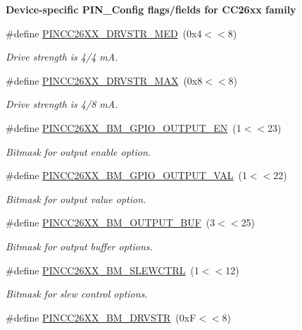 \begin{Indent}{\bf Device-\/specific P\-I\-N\-\_\-\-Config flags/fields for C\-C26xx family}
\begin{DoxyCompactItemize}
\#define \hyperlink{_p_i_n_c_c26_x_x_8h_a2ea27041c2de39b7d28b4a495dd420c3}{P\-I\-N\-C\-C26\-X\-X\-\_\-\-D\-R\-V\-S\-T\-R\-\_\-\-M\-E\-D}~(0x4$<$$<$8)
\begin{DoxyCompactList}\small\item\em Drive strength is 4/4 m\-A. \end{DoxyCompactList}\item 
\#define \hyperlink{_p_i_n_c_c26_x_x_8h_a541e467017624634a4549399479bac35}{P\-I\-N\-C\-C26\-X\-X\-\_\-\-D\-R\-V\-S\-T\-R\-\_\-\-M\-A\-X}~(0x8$<$$<$8)
\begin{DoxyCompactList}\small\item\em Drive strength is 4/8 m\-A. \end{DoxyCompactList}\item 
\#define \hyperlink{_p_i_n_c_c26_x_x_8h_a6563826ffb2b58202eb73a66a65300cd}{P\-I\-N\-C\-C26\-X\-X\-\_\-\-B\-M\-\_\-\-G\-P\-I\-O\-\_\-\-O\-U\-T\-P\-U\-T\-\_\-\-E\-N}~(1$<$$<$23)
\begin{DoxyCompactList}\small\item\em Bitmask for output enable option. \end{DoxyCompactList}\item 
\#define \hyperlink{_p_i_n_c_c26_x_x_8h_abf8ccbcf940ccff4ee0b256b536646ea}{P\-I\-N\-C\-C26\-X\-X\-\_\-\-B\-M\-\_\-\-G\-P\-I\-O\-\_\-\-O\-U\-T\-P\-U\-T\-\_\-\-V\-A\-L}~(1$<$$<$22)
\begin{DoxyCompactList}\small\item\em Bitmask for output value option. \end{DoxyCompactList}\item 
\#define \hyperlink{_p_i_n_c_c26_x_x_8h_a15e5f5f426864eecd22dde20df02da4a}{P\-I\-N\-C\-C26\-X\-X\-\_\-\-B\-M\-\_\-\-O\-U\-T\-P\-U\-T\-\_\-\-B\-U\-F}~(3$<$$<$25)
\begin{DoxyCompactList}\small\item\em Bitmask for output buffer options. \end{DoxyCompactList}\item 
\#define \hyperlink{_p_i_n_c_c26_x_x_8h_a84ba4d3153e7ed56d8b5e13a916491dd}{P\-I\-N\-C\-C26\-X\-X\-\_\-\-B\-M\-\_\-\-S\-L\-E\-W\-C\-T\-R\-L}~(1$<$$<$12)
\begin{DoxyCompactList}\small\item\em Bitmask for slew control options. \end{DoxyCompactList}\item 
\#define \hyperlink{_p_i_n_c_c26_x_x_8h_a5454b1e509752bf1630ecb9f8e5ed6c7}{P\-I\-N\-C\-C26\-X\-X\-\_\-\-B\-M\-\_\-\-D\-R\-V\-S\-T\-R}~(0x\-F$<$$<$8)
$$
\end{DoxyCompactItemize}
\end{Indent}
